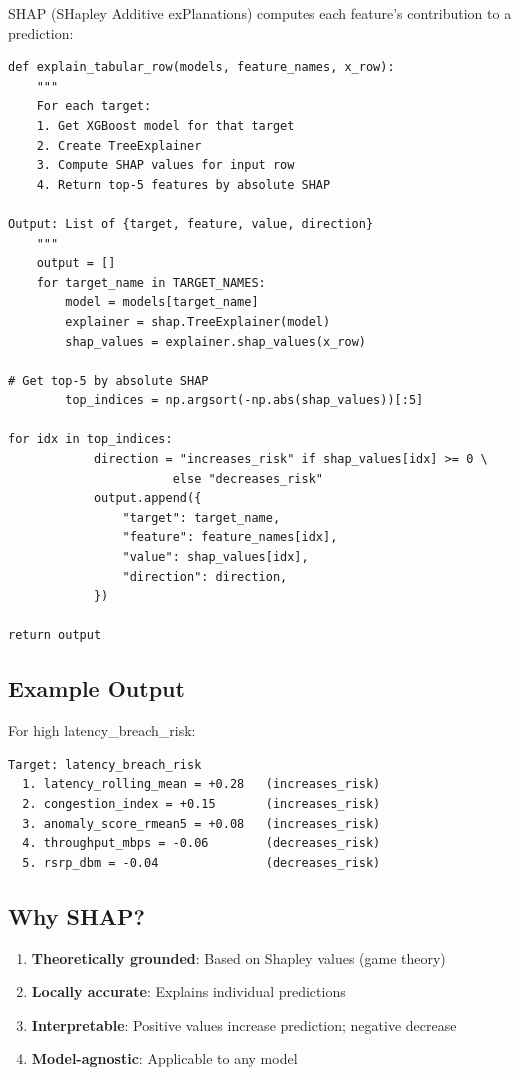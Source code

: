 \documentclass[11pt,a4paper,oneside]{report}
\begin{document}
SHAP (SHapley Additive exPlanations) computes each feature's contribution to a prediction:

\begin{lstlisting}
def explain_tabular_row(models, feature_names, x_row):
    """
    For each target:
    1. Get XGBoost model for that target
    2. Create TreeExplainer
    3. Compute SHAP values for input row
    4. Return top-5 features by absolute SHAP

Output: List of {target, feature, value, direction}
    """
    output = []
    for target_name in TARGET_NAMES:
        model = models[target_name]
        explainer = shap.TreeExplainer(model)
        shap_values = explainer.shap_values(x_row)

# Get top-5 by absolute SHAP
        top_indices = np.argsort(-np.abs(shap_values))[:5]

for idx in top_indices:
            direction = "increases_risk" if shap_values[idx] >= 0 \
                       else "decreases_risk"
            output.append({
                "target": target_name,
                "feature": feature_names[idx],
                "value": shap_values[idx],
                "direction": direction,
            })

return output
\end{lstlisting}

\subsection{Example Output}

For high latency\_breach\_risk:

\begin{verbatim}
Target: latency_breach_risk
  1. latency_rolling_mean = +0.28   (increases_risk)
  2. congestion_index = +0.15       (increases_risk)
  3. anomaly_score_rmean5 = +0.08   (increases_risk)
  4. throughput_mbps = -0.06        (decreases_risk)
  5. rsrp_dbm = -0.04               (decreases_risk)
\end{verbatim}

\subsection{Why SHAP?}

\begin{enumerate}
    \item \textbf{Theoretically grounded}: Based on Shapley values (game theory)
    \item \textbf{Locally accurate}: Explains individual predictions
    \item \textbf{Interpretable}: Positive values increase prediction; negative decrease
    \item \textbf{Model-agnostic}: Applicable to any model
\end{enumerate}
\end{document}
